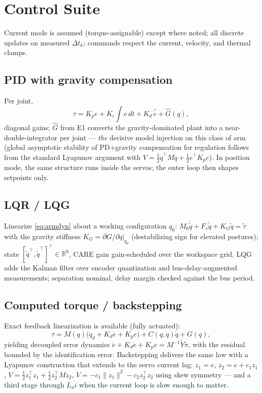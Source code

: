 \documentclass[conference]{IEEEtran}
\begin{document}
\section{Control Suite}
Current mode is assumed (torque-assignable) except where noted; all discrete updates on measured $\Delta t_k$; commands respect the current, velocity, and thermal clamps.

\subsection{PID with gravity compensation}
Per joint,
\begin{equation}
\tau = K_p e + K_i\!\int e\,dt + K_d\,\hat{\dot e} + \hat G(q),
\end{equation}
diagonal gains; $\hat G$ from E1 converts the gravity-dominated plant into a near-double-integrator per joint --- \emph{the} decisive model injection on this class of arm (global asymptotic stability of PD+gravity compensation for regulation follows from the standard Lyapunov argument with $V = \tfrac12\dot q^{\!\top}M\dot q + \tfrac12 e^{\!\top}K_p e$). In position mode, the same structure runs inside the servos; the outer loop then shapes setpoints only.

\subsection{LQR / LQG}
Linearize \eqref{eq:armdyn} about a working configuration $q_0$: $M_0\ddot{\tilde q} + F_{v}\dot{\tilde q} + K_G\tilde q = \tilde\tau$ with the gravity stiffness $K_G = \partial G/\partial q|_{q_0}$ (destabilizing sign for elevated postures); state $[\tilde q^{\!\top}, \dot{\tilde q}^{\!\top}]^{\!\top}\in\mathbb R^8$, CARE gain gain-scheduled over the workspace grid. LQG adds the Kalman filter over encoder quantization and bus-delay-augmented measurements; separation nominal, delay margin checked against the bus period.

\subsection{Computed torque / backstepping}
Exact feedback linearization is available (fully actuated):
\begin{equation}
\tau = M(q)\bigl(\ddot q_d + K_d\dot e + K_p e\bigr) + C(q,\dot q)\dot q + G(q),
\label{eq:ct}
\end{equation}
yielding decoupled error dynamics $\ddot e + K_d\dot e + K_p e = M^{-1}\tilde Y\tilde\pi$, with the residual bounded by the identification error. Backstepping delivers the same law with a Lyapunov construction that extends to the servo current lag: $z_1 = e$, $z_2 = \dot e + c_1 z_1$, $V = \tfrac12 z_1^{\!\top}z_1 + \tfrac12 z_2^{\!\top}M z_2$, $\dot V = -c_1\|z_1\|^2 - c_2 z_2^{\!\top}z_2$ using skew symmetry --- and a third stage through $L_a\dot i$ when the current loop is slow enough to matter.
\end{document}
